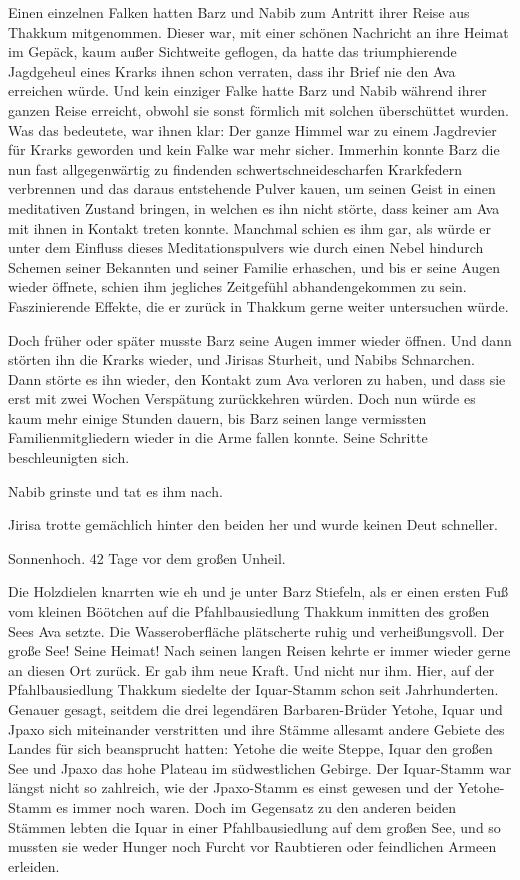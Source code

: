 Einen einzelnen Falken hatten Barz und Nabib zum Antritt ihrer Reise aus Thakkum mitgenommen. Dieser war, mit einer schönen Nachricht an ihre Heimat im Gepäck, kaum außer Sichtweite geflogen, da hatte das triumphierende Jagdgeheul eines Krarks ihnen schon verraten, dass ihr Brief nie den Ava erreichen würde. Und kein einziger Falke hatte Barz und Nabib während ihrer ganzen Reise erreicht, obwohl sie sonst förmlich mit solchen überschüttet wurden. Was das bedeutete, war ihnen klar: Der ganze Himmel war zu einem Jagdrevier für Krarks geworden und kein Falke war mehr sicher. Immerhin konnte Barz die nun fast allgegenwärtig zu findenden schwertschneidescharfen Krarkfedern verbrennen und das daraus entstehende Pulver kauen, um seinen Geist in einen meditativen Zustand bringen, in welchen es ihn nicht störte, dass keiner am Ava mit ihnen in Kontakt treten konnte. Manchmal schien es ihm gar, als würde er unter dem Einfluss dieses Meditationspulvers wie durch einen Nebel hindurch Schemen seiner Bekannten und seiner Familie erhaschen, und bis er seine Augen wieder öffnete, schien ihm jegliches Zeitgefühl abhandengekommen zu sein. Faszinierende Effekte, die er zurück in Thakkum gerne weiter untersuchen würde.

Doch früher oder später musste Barz seine Augen immer wieder öffnen. Und dann störten ihn die Krarks wieder, und Jirisas Sturheit, und Nabibs Schnarchen. Dann störte es ihn wieder, den Kontakt zum Ava verloren zu haben, und dass sie erst mit zwei Wochen Verspätung zurückkehren würden. Doch nun würde es kaum mehr einige Stunden dauern, bis Barz seinen lange vermissten Familienmitgliedern wieder in die Arme fallen konnte. Seine Schritte beschleunigten sich.

Nabib grinste und tat es ihm nach.

Jirisa trotte gemächlich hinter den beiden her und wurde keinen Deut schneller.



\trennzeichen



Sonnenhoch. 42 Tage vor dem großen Unheil.\bigskip



Die Holzdielen knarrten wie eh und je unter Barz Stiefeln, als er einen ersten Fuß vom kleinen Böötchen auf die Pfahlbausiedlung Thakkum inmitten des großen Sees Ava setzte. Die Wasseroberfläche plätscherte ruhig und verheißungsvoll. Der große See! Seine Heimat! Nach seinen langen Reisen kehrte er immer wieder gerne an diesen Ort zurück. Er gab ihm neue Kraft. Und nicht nur ihm. Hier, auf der Pfahlbausiedlung Thakkum siedelte der Iquar-Stamm schon seit Jahrhunderten. Genauer gesagt, seitdem die drei legendären Barbaren-Brüder Yetohe, Iquar und Jpaxo sich miteinander verstritten und ihre Stämme allesamt andere Gebiete des Landes für sich beansprucht hatten: Yetohe die weite Steppe, Iquar den großen See und Jpaxo das hohe Plateau im südwestlichen Gebirge. Der Iquar-Stamm war längst nicht so zahlreich, wie der Jpaxo-Stamm es einst gewesen und der Yetohe-Stamm es immer noch waren. Doch im Gegensatz zu den anderen beiden Stämmen lebten die Iquar in einer Pfahlbausiedlung auf dem großen See, und so mussten sie weder Hunger noch Furcht vor Raubtieren oder feindlichen Armeen erleiden.

